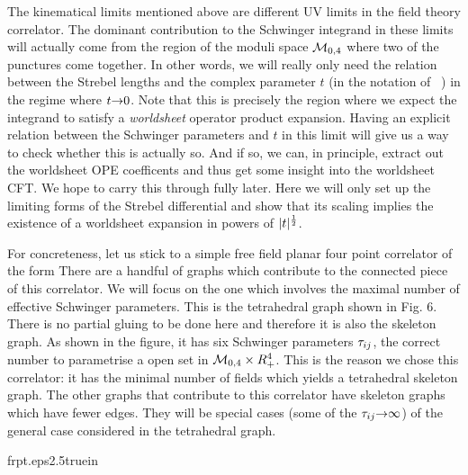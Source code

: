 The kinematical limits mentioned above are different 
UV limits in the field theory correlator. 
The dominant contribution to the Schwinger integrand 
in these limits will actually come from the region of the moduli 
space ${\cal M}_{0,4}$ where two of the punctures come together. 
In other words, we 
will really only need the relation between the Strebel lengths 
and the complex parameter $t$ (in the notation of \qd\ )
in the regime where $t{\rightarrow} 0$. Note that
this is precisely the region where we expect the integrand to satisfy
a {\it worldsheet} operator product expansion. Having an explicit relation
between the Schwinger parameters and $t$ in this limit will give us a 
way to check whether this is actually so. And if so, we can, in principle, 
extract out the worldsheet OPE coefficents and thus get some insight 
into the worldsheet CFT. We hope to carry this through fully later. 
Here we will only set up the limiting forms of the Strebel differential 
and show that its scaling implies the existence of a worldsheet expansion 
in powers of $|t|^{1\over 2}$. 



For concreteness, let us stick to a simple free field planar four point 
correlator of the form
\eqn{} 
There are a handful of graphs which contribute to the connected piece of this 
correlator. We will focus on the one which involves the 
maximal number of effective Schwinger parameters. 
This is the tetrahedral graph shown in Fig. 6. There is no 
partial gluing to be done here and therefore it is also the skeleton graph. 
As shown in the figure, it has six Schwinger parameters ${\tau}_{ij}$,
the correct number to parametrise a open set in ${\cal M}_{0,4}\times R_+^4$. 
This is the reason we chose this correlator: it has the minimal number of 
fields which yields a tetrahedral skeleton graph. The other graphs 
that contribute to this correlator have skeleton graphs which have fewer
edges. They will be special cases (some of the ${\tau}_{ij}{\rightarrow}\infty$)
of the general case considered in the tetrahedral graph. 

%
{frpt.eps}{2.5truein}
%

